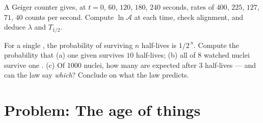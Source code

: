 \begin{exercise}[$\star\star\star$]\label{exo:g12:radioactive-decay:14}
A Geiger counter gives, at $t = 0$, $60$, $120$, $180$, $240$ seconds,
rates of $400$, $225$, $127$, $71$, $40$ counts per second. Compute
$\ln \mathcal A$ at each time, check alignment, and deduce $\lambda$ and
$T_{1/2}$.
\end{exercise}

\begin{exercise}[$\star\star\star$]\label{exo:g12:radioactive-decay:15}
For a single , the probability of surviving $n$ half-lives is
$1/2^{\,n}$. Compute the probability that (a) one given  survives
$10$ half-lives; (b) all of $8$ watched nuclei survive one .
(c) Of \num{1000} nuclei, how many are expected after $3$ half-lives ---
and can the law say \emph{which}? Conclude on what the law predicts.
\end{exercise}

\section{Problem: The age of things}

